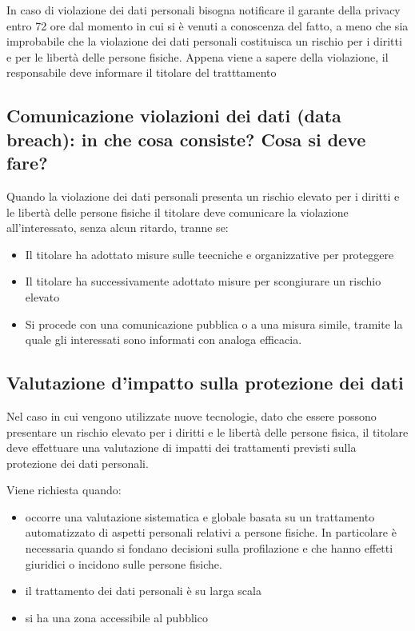 In caso di violazione dei dati personali bisogna notificare il garante della privacy entro 72 ore dal momento in cui si è venuti a conoscenza del fatto, a meno che sia improbabile che la violazione dei dati personali costituisca un rischio per i diritti e per le libertà delle persone fisiche.
\newline
Appena viene a sapere della violazione, il responsabile deve informare il titolare del tratttamento

\subsection{Comunicazione violazioni dei dati (data breach): in che cosa consiste? Cosa si deve fare?}

Quando la violazione dei dati personali presenta un rischio elevato per i diritti e le libertà delle persone fisiche il titolare deve comunicare la violazione all'interessato, senza alcun ritardo, tranne se:
\begin{itemize}
    \item Il titolare ha adottato misure sulle teecniche e organizzative per proteggere
    \item Il titolare ha successivamente adottato misure per scongiurare un rischio elevato
    \item Si procede con una comunicazione pubblica o a una misura simile, tramite la quale gli interessati sono informati con analoga efficacia.
\end{itemize}

\subsection{Valutazione d’impatto sulla protezione dei dati}

Nel caso in cui vengono utilizzate nuove tecnologie, dato che essere possono presentare un rischio elevato per i diritti e le libertà delle persone fisica, il titolare deve effettuare una valutazione di impatti dei trattamenti previsti sulla protezione dei dati personali.

Viene richiesta quando:
\begin{itemize}
    \item occorre una valutazione sistematica e globale basata su un trattamento automatizzato di aspetti personali relativi a persone fisiche.
    In particolare è necessaria quando si fondano decisioni sulla profilazione e che hanno effetti giuridici o incidono sulle persone fisiche.
    \item il trattamento dei dati personali è su larga scala
    \item si ha una zona accessibile al pubblico
\end{itemize}

